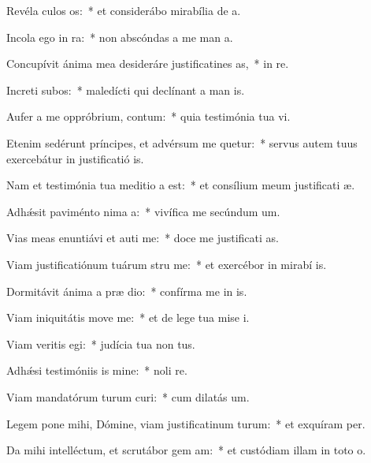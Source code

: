 \item Revéla culos os:~* et considerábo mirabília de  a.
\item Incola ego  in ra:~* non abscóndas a me man a.
\item Concupívit ánima mea desideráre justificatines as,~* in  re.
\item Increti subos:~* maledícti qui declínant a man is.
\item Aufer a me oppróbrium,  contum:~* quia testimónia tua vi.
\item Etenim sedérunt príncipes, et advérsum me quetur:~* servus autem tuus exercebátur in justificatió is.
\item Nam et testimónia tua meditio a est:~* et consílium meum justificati æ.
\item Adhǽsit paviménto nima a:~* vivífica me secúndum  um.
\item Vias meas enuntiávi et auti me:~* doce me justificati as.
\item Viam justificatiónum tuárum stru me:~* et exercébor in mirabí is.
\item Dormitávit ánima a præ dio:~* confírma me in  is.
\item Viam iniquitátis move  me:~* et de lege tua mise i.
\item Viam veritis egi:~* judícia tua non  tus.
\item Adhǽsi testimóniis is mine:~* noli  re.
\item Viam mandatórum turum curi:~* cum dilatás  um.
\item Legem pone mihi, Dómine, viam justificatinum turum:~* et exquíram  per.
\item Da mihi intelléctum, et scrutábor gem am:~* et custódiam illam in toto  o.

